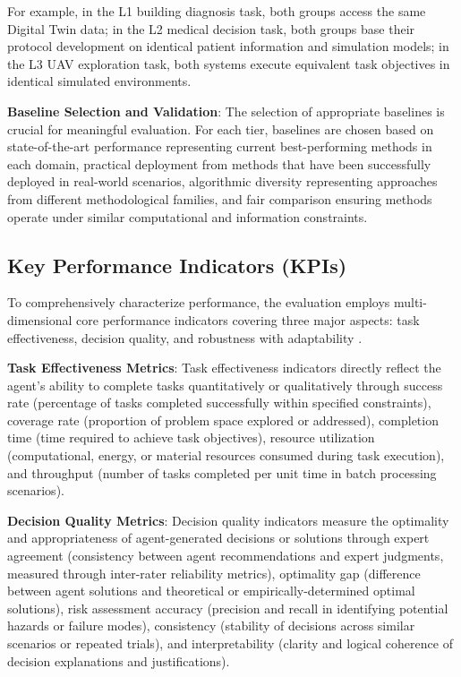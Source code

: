 For example, in the L1 building diagnosis task, both groups access the same Digital Twin data; in the L2 medical decision task, both groups base their protocol development on identical patient information and simulation models; in the L3 UAV exploration task, both systems execute equivalent task objectives in identical simulated environments.

\textbf{Baseline Selection and Validation}: The selection of appropriate baselines is crucial for meaningful evaluation. For each tier, baselines are chosen based on state-of-the-art performance representing current best-performing methods in each domain, practical deployment from methods that have been successfully deployed in real-world scenarios, algorithmic diversity representing approaches from different methodological families, and fair comparison ensuring methods operate under similar computational and information constraints.

\subsection{Key Performance Indicators (KPIs)}

To comprehensively characterize performance, the evaluation employs multi-dimensional core performance indicators covering three major aspects: task effectiveness, decision quality, and robustness with adaptability \cite{hernandez2022measuring}.

\textbf{Task Effectiveness Metrics}: Task effectiveness indicators directly reflect the agent's ability to complete tasks quantitatively or qualitatively through success rate (percentage of tasks completed successfully within specified constraints), coverage rate (proportion of problem space explored or addressed), completion time (time required to achieve task objectives), resource utilization (computational, energy, or material resources consumed during task execution), and throughput (number of tasks completed per unit time in batch processing scenarios).

\textbf{Decision Quality Metrics}: Decision quality indicators measure the optimality and appropriateness of agent-generated decisions or solutions through expert agreement (consistency between agent recommendations and expert judgments, measured through inter-rater reliability metrics), optimality gap (difference between agent solutions and theoretical or empirically-determined optimal solutions), risk assessment accuracy (precision and recall in identifying potential hazards or failure modes), consistency (stability of decisions across similar scenarios or repeated trials), and interpretability (clarity and logical coherence of decision explanations and justifications).

